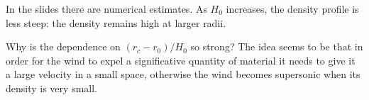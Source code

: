 \documentclass[main.tex]{subfiles}
\begin{document}
In the slides there are numerical estimates. 
As \(H_0 \) increases, the density profile is less steep: the density remains high at larger radii.

\begin{bluebox}
Why is the dependence on \((r_c - r_0 ) /H_0 \) so strong? The idea seems to be that in order for the wind to expel a significative quantity of material it needs to give it a large velocity in a small space, otherwise the wind becomes supersonic when its density is very small.
\end{bluebox}
\end{document}
